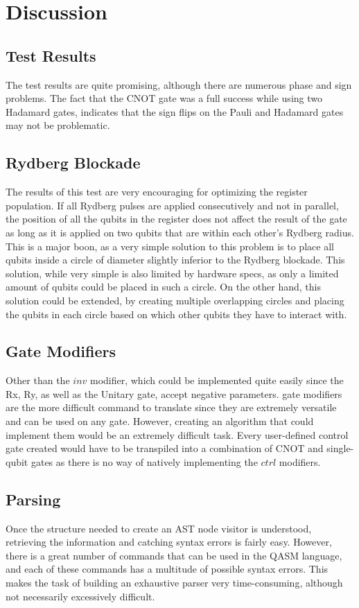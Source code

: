 \section{Discussion}
\label{Discussion}
\subsection{Test Results}
The test results are quite promising, although there are numerous phase and sign problems. The fact that the CNOT gate was a full success while using two Hadamard gates, indicates that the sign flips on the 
Pauli and Hadamard gates may not be problematic. 

\subsection{Rydberg Blockade}
The results of this test are very encouraging for optimizing the register population. If all 
Rydberg pulses are applied consecutively and not in parallel, the position of all the qubits in the register does not affect the result of the gate as long as it is applied
on two qubits that are within each other's Rydberg radius. This is a major boon, as a very simple solution to this problem is to place all qubits inside a circle of diameter slightly 
inferior to the Rydberg blockade. This solution, while very simple is also limited by hardware specs, as only a limited amount of qubits could be placed in such a circle.
On the other hand, this solution could be extended, by creating multiple overlapping circles and placing the qubits in each circle based on which other qubits they have to interact with.



\subsection{Gate Modifiers}

Other than the $inv$ modifier, which could be implemented quite easily since the Rx, Ry, as well as the Unitary gate, accept negative parameters. gate modifiers are the more difficult command to translate since they are extremely versatile and can be used on any gate.
However, creating an algorithm that could implement them would be an extremely difficult task. Every user-defined control gate created would have to be transpiled into a combination
of CNOT and single-qubit gates as there is no way of natively implementing the $ctrl$ modifiers.  


\subsection{Parsing}
Once the structure needed to create an AST node visitor is understood, retrieving the information and catching syntax errors is fairly easy.
However, there is a great number of commands that can be used in the QASM language, and each of these commands has a multitude of possible syntax errors.
This makes the task of building an exhaustive parser very time-consuming, although not necessarily excessively difficult.


